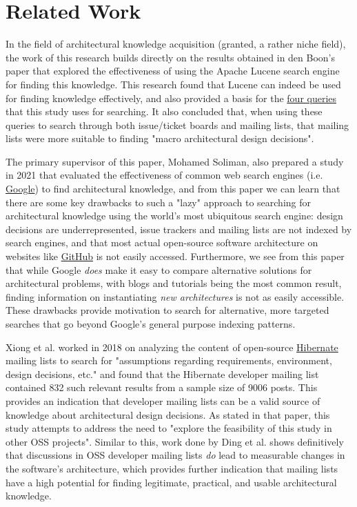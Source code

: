 \documentclass[a4paper, 12pt]{article}
\begin{document}
\section{Related Work}
	In the field of architectural knowledge acquisition (granted, a rather niche field), the work of this research builds directly on the results obtained in den Boon's paper that explored the effectiveness of using the Apache Lucene search engine for finding this knowledge\autocite{denboon}. This research found that Lucene can indeed be used for finding knowledge effectively, and also provided a basis for the \hyperref[sec:queries]{four queries} that this study uses for searching. It also concluded that, when using these queries to search through both issue/ticket boards and mailing lists, that mailing lists were more suitable to finding "macro architectural design decisions".
	
	The primary supervisor of this paper, Mohamed Soliman, also prepared a study in 2021 that evaluated the effectiveness of common web search engines (i.e. \href{https://google.com}{Google}) to find architectural knowledge, and from this paper we can learn that there are some key drawbacks to such a "lazy" approach to searching for architectural knowledge using the world's most ubiquitous search engine: design decisions are underrepresented, issue trackers and mailing lists are not indexed by search engines, and that most actual open-source software architecture on websites like \href{https://github.com}{GitHub} is not easily accessed. Furthermore, we see from this paper that while Google \textit{does} make it easy to compare alternative solutions for architectural problems, with blogs and tutorials being the most common result, finding information on instantiating \textit{new architectures} is not as easily accessible. These drawbacks provide motivation to search for alternative, more targeted searches that go beyond Google's general purpose indexing patterns\autocite{soliman}.
	
	Xiong et al. worked in 2018 on analyzing the content of open-source \href{https://hibernate.org/}{Hibernate} mailing lists to search for "assumptions regarding requirements, environment, design decisions, etc." and found that the Hibernate developer mailing list contained 832 such relevant results from a sample size of 9006 posts. This provides an indication that developer mailing lists can be a valid source of knowledge about architectural design decisions\autocite{xiong}. As stated in that paper, this study attempts to address the need to "explore the feasibility of this study in other OSS projects". Similar to this, work done by Ding et al. shows definitively that discussions in OSS developer mailing lists \textit{do} lead to measurable changes in the software's architecture, which provides further indication that mailing lists have a high potential for finding legitimate, practical, and usable architectural knowledge\autocite{ding}.
	
\end{document}
